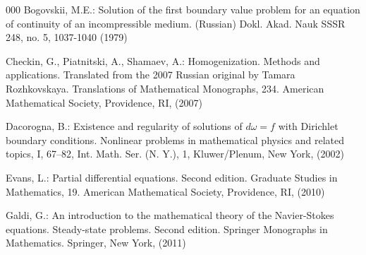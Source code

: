 \documentclass[13pt,CJK]{article}
\theoremstyle{plain}                       %
\theoremstyle{remark}
\numberwithin{equation}{section}
\begin{document}
\begin{thebibliography}{000}
Bogovskii, M.E.: 
Solution of the first boundary value problem for an equation of continuity of an incompressible medium. (Russian) Dokl. Akad. Nauk SSSR 248, no. 5, 1037-1040 (1979)




Checkin, G., Piatnitski, A., Shamaev, A.:
Homogenization. Methods and applications.
Translated from the 2007 Russian original by Tamara Rozhkovskaya.
Translations of Mathematical Monographs, 234.
American Mathematical Society, Providence, RI,
(2007)

Dacorogna, B.: Existence and regularity of solutions of $d\omega=f$ with Dirichlet boundary conditions. Nonlinear problems in mathematical physics and related topics, I, 67–82, Int. Math. Ser. (N. Y.), 1, Kluwer/Plenum, New York, (2002)

Evans, L.: Partial differential equations.
Second edition. Graduate Studies in Mathematics,
19. American Mathematical Society, Providence, RI, (2010)





Galdi, G.:
An introduction to the mathematical theory of the Navier-Stokes equations.
Steady-state problems. Second edition.
Springer Monographs in Mathematics. Springer, New York,
(2011)


\end{thebibliography}
\end{document}

